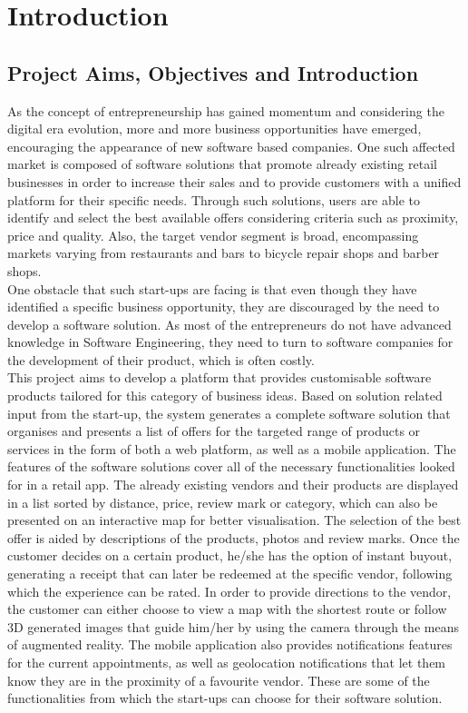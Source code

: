 \section{Introduction}

\subsection{Project Aims, Objectives and Introduction} 

As the concept of entrepreneurship has gained momentum and considering the digital era evolution, more and more business opportunities have emerged, encouraging the appearance of new software based companies. One such affected market is composed of software solutions that promote already existing retail businesses in order to increase their sales and to provide customers with a unified platform for their specific needs. Through such solutions, users are able to identify and select the best available offers considering criteria such as proximity, price and quality. Also, the target vendor segment is broad, encompassing markets varying from restaurants and bars to bicycle repair shops and barber shops.\\

One obstacle that such start-ups are facing is that even though they have identified a specific business opportunity, they are discouraged by the need to develop a software solution. As most of the entrepreneurs do not have advanced knowledge in Software Engineering, they need to turn to software companies for the development of their product, which is often costly.\\

This project aims to develop a platform that provides customisable software products tailored for this category of business ideas. Based on solution related input from the start-up, the system generates a complete software solution that organises and presents a list of offers for the targeted range of products or services in the form of both a web platform, as well as a mobile application. The features of the software solutions cover all of the necessary functionalities looked for in a retail app. The already existing vendors and their products are displayed in a list sorted by distance, price, review mark or category, which can also be presented on an interactive map for better visualisation. The selection of the best offer is aided by descriptions of the products, photos and review marks. Once the customer decides on a certain product, he/she has the option of instant buyout, generating a receipt that can later be redeemed at the specific vendor, following which the experience can be rated. In order to provide directions to the vendor, the customer can either choose to view a map with the shortest route or follow 3D generated images that guide him/her by using the camera through the means of augmented reality. The mobile application also provides notifications features for the current appointments, as well as geolocation notifications that let them know they are in the proximity of a favourite vendor. These are some of the functionalities from which the start-ups can choose for their software solution.\\

